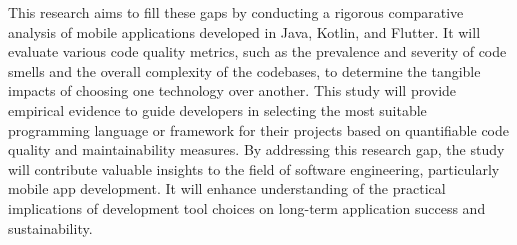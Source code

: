 \par
This research aims to fill these gaps by conducting a rigorous comparative analysis of mobile applications developed in Java, Kotlin, and Flutter. It will evaluate various code quality metrics, such as the prevalence and severity of code smells and the overall complexity of the codebases, to determine the tangible impacts of choosing one technology over another. This study will provide empirical evidence to guide developers in selecting the most suitable programming language or framework for their projects based on quantifiable code quality and maintainability measures. By addressing this research gap, the study will contribute valuable insights to the field of software engineering, particularly mobile app development. It will enhance understanding of the practical implications of development tool choices on long-term application success and sustainability.
